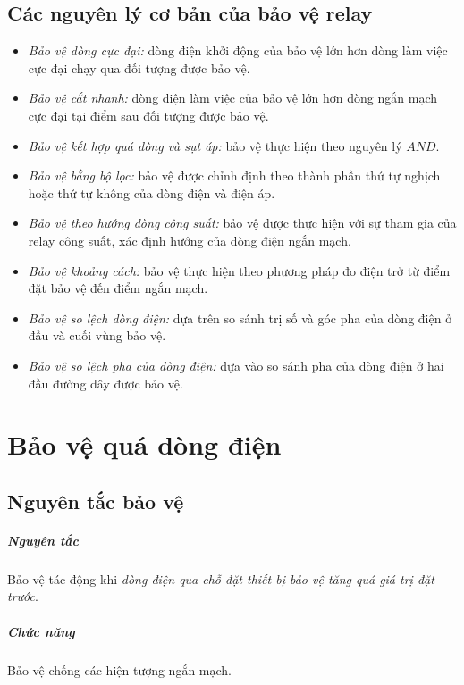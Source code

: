 \documentclass[12pt,a4paper]{article}
\begin{document}
\subsection{Các nguyên lý cơ bản của bảo vệ relay}
	\begin{itemize}
		\item \emph{Bảo vệ dòng cực đại:} dòng điện khởi động của bảo vệ lớn hơn dòng làm việc cực đại chạy qua đối tượng được bảo vệ.
		
		\item \emph{Bảo vệ cắt nhanh:} dòng điện làm việc của bảo vệ lớn hơn dòng ngắn mạch cực đại tại điểm sau đối tượng được bảo vệ.

		\item \emph{Bảo vệ kết hợp quá dòng và sụt áp:} bảo vệ thực hiện theo nguyên lý $AND$.
		
		\item \emph{Bảo vệ bằng bộ lọc:} bảo vệ được chỉnh định theo thành phần thứ tự nghịch hoặc thứ tự không của dòng điện và điện áp.
		
		\item \emph{Bảo vệ theo hướng dòng công suất:} bảo vệ được thực hiện với sự tham gia của relay công suất, xác định hướng của dòng điện ngắn mạch.
		
		\item \emph{Bảo vệ khoảng cách:} bảo vệ thực hiện theo phương pháp đo điện trở từ điểm đặt bảo vệ đến điểm ngắn mạch.
		
		\item \emph{Bảo vệ so lệch dòng điện:} dựa trên so sánh trị số và góc pha của dòng điện ở đầu và cuối vùng bảo vệ.
		
		\item \emph{Bảo vệ so lệch pha của dòng điện:} dựa vào so sánh pha của dòng điện ở hai đầu đường dây được bảo vệ.
		
	\end{itemize}

\newpage
\section{Bảo vệ quá dòng điện}
\subsection{Nguyên tắc bảo vệ}
	\subparagraph{Nguyên tắc} Bảo vệ tác động khi \emph{dòng điện qua chỗ đặt thiết bị bảo vệ tăng quá giá trị đặt trước}.	

	\subparagraph{Chức năng} Bảo vệ chống các hiện tượng ngắn mạch.
	
\end{document}
